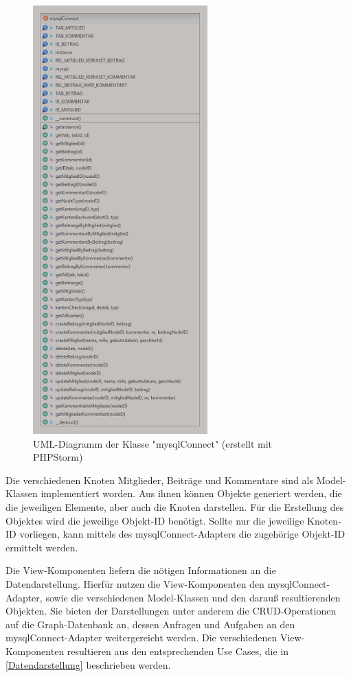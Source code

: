 \begin{figure}[h]
	\caption{UML-Diagramm der Klasse "mysqlConnect" (erstellt mit PHPStorm)}
	\centering
	\includegraphics[width=0.6\textwidth]{images/mysqlConnect2.png}
\end{figure}

Die verschiedenen Knoten Mitglieder, Beiträge und Kommentare sind als Model-Klassen implementiert worden. Aus ihnen können Objekte generiert werden, die die jeweiligen Elemente, aber auch die Knoten darstellen. Für die Erstellung des Objektes wird die jeweilige Objekt-ID benötigt. Sollte nur die jeweilige Knoten-ID vorliegen, kann mittels des mysqlConnect-Adapters die zugehörige Objekt-ID ermittelt werden.

Die View-Komponenten liefern die nötigen Informationen an die Datendarstellung. Hierfür nutzen die View-Komponenten den mysqlConnect-Adapter, sowie die verschiedenen Model-Klassen und den darauß resultierenden Objekten. Sie bieten der Darstellungen unter anderem die CRUD-Operationen auf die Graph-Datenbank an, dessen Anfragen und Aufgaben an den mysqlConnect-Adapter weitergereicht werden. Die verschiedenen View-Komponenten resultieren aus den entsprechenden Use Cases, die in \ref{Datendarstellung}  beschrieben werden.

